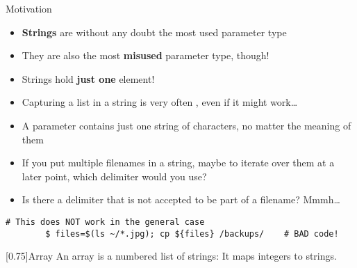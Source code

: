 
\begin{frame}[fragile]{Motivation}
    \vspace{-3mm}
    \begin{itemize}
        \item \textbf{Strings} are without any doubt the most used parameter type
        \item They are also the most \textbf{misused} parameter type, though!
        \item Strings hold \alert{\textbf{just one}} element!
        \item Capturing a list in a string is very often , even if it might work\ldots
        \item A parameter contains just one string of characters, no matter the meaning of them
        \item If you put multiple filenames in a string, maybe to iterate over them at a later point, which delimiter would you use?
        \item Is there a delimiter that is not accepted to be part of a filename? Mmmh\ldots
    \end{itemize}
    \begin{lstlisting}[style=MyBash, numbers=none]
        # This does NOT work in the general case
        $ files=$(ls ~/*.jpg); cp ${files} /backups/    # BAD code!
    \end{lstlisting}
    \begin{varblock}{}[0.75\textwidth]{Array}
        An array is a numbered list of strings: It maps integers to strings. 
    \end{varblock}
\end{frame}
